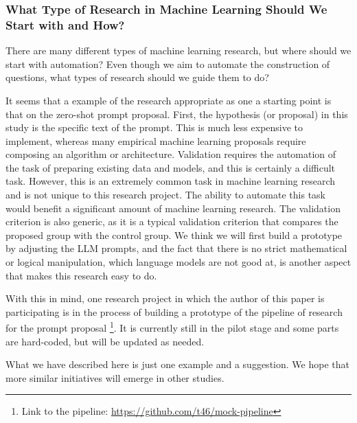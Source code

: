 \subsubsection{What Type of Research in Machine Learning Should We Start with and How?}
There are many different types of machine learning research, but where should we start with automation? Even though we aim to automate the construction of questions, what types of research should we guide them to do?

It seems that a example of the research appropriate as one a starting point is that on the zero-shot prompt proposal. First, the hypothesis (or proposal) in this study is the specific text of the prompt. This is much less expensive to implement, whereas many empirical machine learning proposals require composing an algorithm or architecture. Validation requires the automation of the task of preparing existing data and models, and this is certainly a difficult task. However, this is an extremely common task in machine learning research and is not unique to this research project. The ability to automate this task would benefit a significant amount of machine learning research. The validation criterion is also generic, as it is a typical validation criterion that compares the proposed group with the control group. We think we will first build a prototype by adjusting the LLM prompts, and the fact that there is no strict mathematical or logical manipulation, which language models are not good at, is another aspect that makes this research easy to do.

With this in mind, one research project in which the author of this paper is participating is in the process of building a prototype of the pipeline of research for the prompt proposal \footnote{
Link to the pipeline: \href{https://github.com/t46/mock-pipeline}{https://github.com/t46/mock-pipeline}
}. It is currently still in the pilot stage and some parts are hard-coded, but will be updated as needed.

What we have described here is just one example and a suggestion. We hope that more similar initiatives will emerge in other studies.

